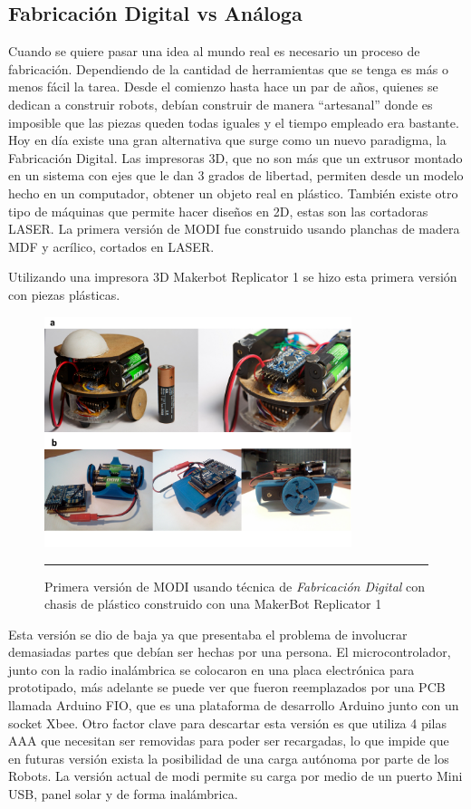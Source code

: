 \subsection{Fabricación Digital vs Análoga}
Cuando se quiere pasar una idea al mundo real es necesario un proceso de fabricación. Dependiendo de la cantidad de herramientas que se tenga es más o menos fácil la tarea. Desde el comienzo hasta hace un par de años, quienes se dedican a construir robots, debían construir de manera “artesanal” donde es imposible que las piezas queden todas iguales y el tiempo empleado era bastante. Hoy en día existe una gran alternativa que surge como un nuevo paradigma, la Fabricación Digital. Las impresoras 3D, que no son más que un extrusor montado en un sistema con ejes que le dan 3 grados de libertad, permiten desde un modelo hecho en un computador, obtener un objeto real en plástico. También existe otro tipo de máquinas que permite hacer diseños en 2D, estas son las cortadoras LASER. La primera versión de MODI fue construido usando planchas de madera MDF y acrílico, cortados en LASER.




Utilizando una impresora 3D Makerbot Replicator 1 se hizo esta primera versión con piezas plásticas.

\begin{figure}[htbp]
	\centering
		\includegraphics[width=0.8\textwidth]{./Pictures/modi_analogToDigital.png}
		\rule{35em}{0.5pt}
	\caption[modireplicator]{Primera versión de MODI usando técnica de \emph{ Fabricación Digital }con chasis de plástico construido con una MakerBot Replicator 1}
	\label{fig:modireplicator}
\end{figure}



Esta versión se dio de baja ya que presentaba el problema de involucrar demasiadas partes que debían ser hechas por una persona. El microcontrolador, junto con la radio inalámbrica se colocaron en una placa electrónica para prototipado, más adelante se puede ver que fueron reemplazados por una PCB llamada Arduino FIO, que es una plataforma de desarrollo Arduino junto con un socket Xbee. Otro factor clave para descartar esta versión es que utiliza 4 pilas AAA que necesitan ser removidas para poder ser recargadas, lo que impide que en futuras versión exista la posibilidad de una carga autónoma por parte de los Robots. La versión actual de modi permite su carga por medio de un puerto Mini USB, panel solar y de forma inalámbrica.

